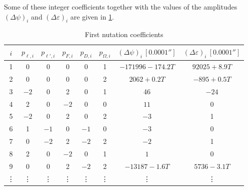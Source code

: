 \documentclass[../main.tex]{subfiles}
\begin{document}
Some of these integer coefficients together with the values of the amplitudes ${(\Delta\psi)}_i$ and ${(\Delta\varepsilon)}_i$  are given in \cref{tab:nutation_coefficients}.
\begin{table}[ht]
  \centering
  \begin{tabular}{|c|ccccc|c|c|}
    \hline
    $i$    & $p_{\ell,i}$ & $p_{\ell',i}$ & $p_{F,i}$ & $p_{D,i}$ & $p_{\Omega,i}$ & ${(\Delta\psi)}_i\ [0.0001'']$ & ${(\Delta\varepsilon)}_i\ [0.0001'']$ \\
    \hline
    1      & 0            & 0             & 0         & 0         & 1              & $-171996 -174.2T$              & $92025+8.9T$                          \\
    2      & 0            & 0             & 0         & 0         & 2              & $2062+0.2T$                    & $-895+0.5T$                           \\
    3      & $-2$         & 0             & 2         & 0         & 1              & 46                             & $-24$                                 \\
    4      & 2            & 0             & $-2$      & 0         & 0              & $11$                           & 0                                     \\
    5      & $-2$         & 0             & 2         & 0         & 2              & $-3$                           & 1                                     \\
    6      & 1            & $-1$          & 0         & $-1$      & 0              & $-3$                           & 0                                     \\
    7      & 0            & $-2$          & 2         & $-2$      & 2              & $-2$                           & 1                                     \\
    8      & 2            & 0             & $-2$      & 0         & 1              & $1$                            & $0$                                   \\
    9      & 0            & 0             & 2         & $-2$      & 2              & $-13187-1.6T$                  & $5736-3.1T$                           \\
    \vdots & \vdots       & \vdots        & \vdots    & \vdots    & \vdots         & \vdots                         & \vdots                                \\
  \end{tabular}
  \caption{First nutation coefficients}
  \label{tab:nutation_coefficients}
\end{table}
\end{document}
